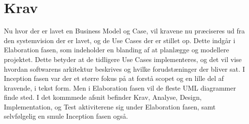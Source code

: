 \chapter{Krav}\label{ch:krav}
Nu hvor der er lavet en Business Model og Case, vil kravene nu præciseres ud fra den systemvision der er lavet, og de Use Cases der er stillet op. Dette indgår i Elaboration fasen, som indeholder en blanding af at planlægge og modellere projektet. Dette betyder at de tidligere Use Cases implementeres, og det vil vise hvordan softwarens arkitektur beskrives og hvilke forudstæninger der bliver sat. I Inception fasen var der et større fokus på at forstå scopet og en lille del af kravende, i tekst form. Men i Elaboration fasen vil de fleste UML diagrammer finde sted\cite{Larman2004}. I det kommmede afsnit befinder Krav, Analyse, Design, Implementation, og Test aktiviterene sig under Elaboration fasen, samt selvfølgelig en smule Inception fasen også. 



 